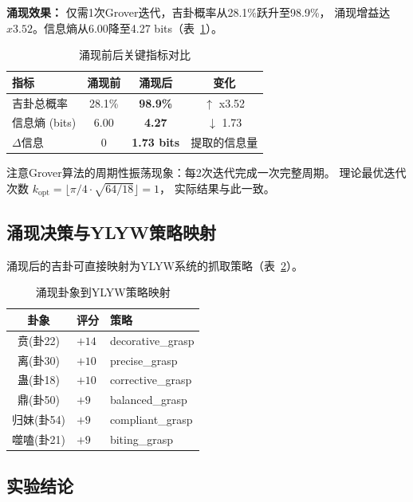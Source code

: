 \documentclass[twocolumn]{article}
\begin{document}
\textbf{涌现效果：} 仅需1次Grover迭代，吉卦概率从28.1\%跃升至98.9\%，
涌现增益达$x3.52$。信息熵从6.00降至4.27 bits（表~\ref{tab:metrics}）。

\begin{table}[htbp]
\centering
\caption{涌现前后关键指标对比}
\label{tab:metrics}
\begin{tabular}{lccc}
\toprule
\textbf{指标} & \textbf{涌现前} & \textbf{涌现后} & \textbf{变化} \\
\midrule
吉卦总概率 & 28.1\% & \textbf{98.9\%} & $\uparrow$ x3.52 \\
信息熵 (bits) & 6.00 & \textbf{4.27} & $\downarrow$ 1.73 \\
$\Delta$信息 & 0 & \textbf{1.73 bits} & 提取的信息量 \\
\bottomrule
\end{tabular}
\end{table}

注意Grover算法的周期性振荡现象：每2次迭代完成一次完整周期。
理论最优迭代次数 $k_{\text{opt}} = \lfloor \pi/4 \cdot \sqrt{64/18} \rfloor = 1$，
实际结果与此一致。

\subsection{涌现决策与YLYW策略映射}

涌现后的吉卦可直接映射为YLYW系统的抓取策略（表~\ref{tab:mapping}）。

\begin{table}[htbp]
\centering
\caption{涌现卦象到YLYW策略映射}
\label{tab:mapping}
\begin{tabular}{cll}
\toprule
\textbf{卦象} & \textbf{评分} & \textbf{策略} \\
\midrule
贲(卦22) & $+14$ & decorative\_grasp \\
离(卦30) & $+10$ & precise\_grasp \\
蛊(卦18) & $+10$ & corrective\_grasp \\
鼎(卦50) & $+9$  & balanced\_grasp \\
归妹(卦54) & $+9$  & compliant\_grasp \\
噬嗑(卦21) & $+9$  & biting\_grasp \\
\bottomrule
\end{tabular}
\end{table}

\subsection{实验结论}
\end{document}
